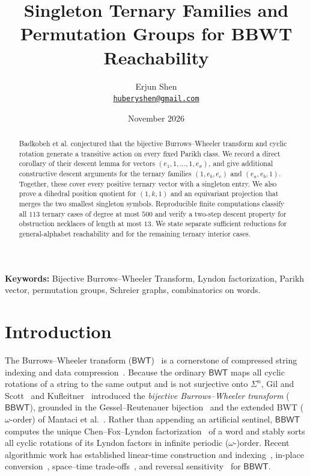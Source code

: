 \documentclass[11pt,a4paper]{article}
\title{Singleton Ternary Families and Permutation Groups for BBWT Reachability}
\author{Erjun Shen\\{\small\href{mailto:huberyshen@gmail.com}{\nolinkurl{huberyshen@gmail.com}}}}
\date{November 2026}
\theoremstyle{definition}
\newcommand{\BBWT}{\mathsf{BBWT}}
\newcommand{\BWT}{\mathsf{BWT}}
\begin{document}
\maketitle

\begin{abstract}
Badkobeh et al. conjectured that the bijective Burrows--Wheeler transform and cyclic rotation generate a transitive action on every fixed Parikh class. We record a direct corollary of their descent lemma for vectors $(e_1,1,\dots,1,e_\sigma)$, and give additional constructive descent arguments for the ternary families $(1,e_b,e_c)$ and $(e_a,e_b,1)$. Together, these cover every positive ternary vector with a singleton entry. We also prove a dihedral position quotient for $(1,k,1)$ and an equivariant projection that merges the two smallest singleton symbols. Reproducible finite computations classify all $113$ ternary cases of degree at most $500$ and verify a two-step descent property for obstruction necklaces of length at most $13$. We state separate sufficient reductions for general-alphabet reachability and for the remaining ternary interior cases.

\end{abstract}

\noindent\textbf{Keywords:} Bijective Burrows--Wheeler Transform, Lyndon factorization, Parikh vector, permutation groups, Schreier graphs, combinatorics on words.

\section{Introduction}

The Burrows--Wheeler transform ($\BWT$)~\cite{BurrowsWheeler1994} is a cornerstone of compressed string indexing and data compression~\cite{KempaKociumaka2022}. Because the ordinary $\BWT$ maps all cyclic rotations of a string to the same output and is not surjective onto $\Sigma^n$, Gil and Scott~\cite{GilScott2012} and Kufleitner~\cite{Kufleitner2009} introduced the \emph{bijective Burrows--Wheeler transform} ($\BBWT$), grounded in the Gessel--Reutenauer bijection~\cite{GesselReutenauer1993} and the extended BWT ($\omega$-order) of Mantaci et al.~\cite{Mantaci2007}. Rather than appending an artificial sentinel, $\BBWT$ computes the unique Chen--Fox--Lyndon factorization~\cite{ChenFoxLyndon1958} of a word and stably sorts all cyclic rotations of its Lyndon factors in infinite periodic ($\omega$-)order. Recent algorithmic work has established linear-time construction and indexing~\cite{Bannai2021LinearBBWT,Bannai2024ConstructionIndexing}, in-place conversion~\cite{Koppl2020InPlaceBBWT}, space--time trade-offs~\cite{KopplI2026Tradeoff}, and reversal sensitivity~\cite{Bannai2026Reversal} for $\BBWT$.
\end{document}
